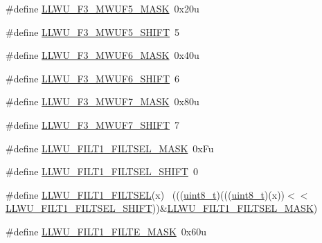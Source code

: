 \begin{DoxyCompactItemize}
\item 
\#define \hyperlink{group___l_l_w_u___register___masks_gaeb14754fa2d5b4c1fd50b9df98f11b01}{L\+L\+W\+U\+\_\+\+F3\+\_\+\+M\+W\+U\+F5\+\_\+\+M\+A\+SK}~0x20u
\item 
\#define \hyperlink{group___l_l_w_u___register___masks_gac8a9d2de72a5034fae66714d25aa5f33}{L\+L\+W\+U\+\_\+\+F3\+\_\+\+M\+W\+U\+F5\+\_\+\+S\+H\+I\+FT}~5
\item 
\#define \hyperlink{group___l_l_w_u___register___masks_gabd1f915448c7918a8aabc74239d7e773}{L\+L\+W\+U\+\_\+\+F3\+\_\+\+M\+W\+U\+F6\+\_\+\+M\+A\+SK}~0x40u
\item 
\#define \hyperlink{group___l_l_w_u___register___masks_gaab649d98d5d8eb9f2f272649ace225c4}{L\+L\+W\+U\+\_\+\+F3\+\_\+\+M\+W\+U\+F6\+\_\+\+S\+H\+I\+FT}~6
\item 
\#define \hyperlink{group___l_l_w_u___register___masks_ga2ddb11dc5e9f8a8404ccf99f10046b5a}{L\+L\+W\+U\+\_\+\+F3\+\_\+\+M\+W\+U\+F7\+\_\+\+M\+A\+SK}~0x80u
\item 
\#define \hyperlink{group___l_l_w_u___register___masks_gaee31def5b074844cbf46f9d7e54d2d4f}{L\+L\+W\+U\+\_\+\+F3\+\_\+\+M\+W\+U\+F7\+\_\+\+S\+H\+I\+FT}~7
\item 
\#define \hyperlink{group___l_l_w_u___register___masks_gaa44e21d07f509d1f5d6cec9da32ab8ab}{L\+L\+W\+U\+\_\+\+F\+I\+L\+T1\+\_\+\+F\+I\+L\+T\+S\+E\+L\+\_\+\+M\+A\+SK}~0x\+Fu
\item 
\#define \hyperlink{group___l_l_w_u___register___masks_gaab2a7991b2b135f0557b1b41cc3528f7}{L\+L\+W\+U\+\_\+\+F\+I\+L\+T1\+\_\+\+F\+I\+L\+T\+S\+E\+L\+\_\+\+S\+H\+I\+FT}~0
\item 
\#define \hyperlink{group___l_l_w_u___register___masks_ga40cff44853a583ea7ff5a043a335944b}{L\+L\+W\+U\+\_\+\+F\+I\+L\+T1\+\_\+\+F\+I\+L\+T\+S\+EL}(x)                                    ~(((\hyperlink{_p_e___types_8h_aba7bc1797add20fe3efdf37ced1182c5}{uint8\+\_\+t})(((\hyperlink{_p_e___types_8h_aba7bc1797add20fe3efdf37ced1182c5}{uint8\+\_\+t})(x))$<$$<$\hyperlink{group___l_l_w_u___register___masks_gaab2a7991b2b135f0557b1b41cc3528f7}{L\+L\+W\+U\+\_\+\+F\+I\+L\+T1\+\_\+\+F\+I\+L\+T\+S\+E\+L\+\_\+\+S\+H\+I\+FT}))\&\hyperlink{group___l_l_w_u___register___masks_gaa44e21d07f509d1f5d6cec9da32ab8ab}{L\+L\+W\+U\+\_\+\+F\+I\+L\+T1\+\_\+\+F\+I\+L\+T\+S\+E\+L\+\_\+\+M\+A\+SK})
\item 
\#define \hyperlink{group___l_l_w_u___register___masks_gae449f984f9cfeec99ab8380e356b57c7}{L\+L\+W\+U\+\_\+\+F\+I\+L\+T1\+\_\+\+F\+I\+L\+T\+E\+\_\+\+M\+A\+SK}~0x60u
\item 
$$
\end{DoxyCompactItemize}
